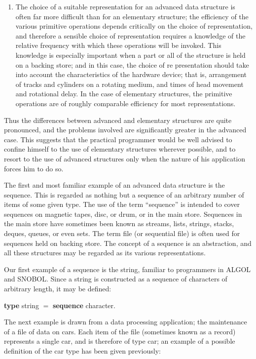\documentclass[twoside,11pt]{book}
\begin{document}
\begin{enumerate}[wide, nosep, label=(\arabic*)]
	\item The choice of a suitable representation for an advanced data structure is often far more difficult than for an elementary structure; the efficiency of the various primitive operations depends critically on the choice of representation, and therefore a sensible choice of representation requires a knowledge of the relative frequency with which these operations will be invoked. This knowledge is especially important when a part or all of the structure is held on a backing store; and in this case, the choice of re presentation should take into account the characteristics of the hardware device; that is, arrangement of tracks and cylinders on a rotating medium, and times of head movement and rotational delay. In the case of elementary structures, the primitive operations are of roughly comparable efficiency for most representations.
\end{enumerate}

Thus the differences between advanced and elementary structures are quite pronounced, and the problems involved are significantly greater in the advanced case. This suggests that the practical programmer would be well advised to confine himself to the use of elementary structures wherever possible, and to resort to the use of advanced structures only when the nature of his application forces him to do so.

The first and most familiar example of an advanced data structure is the sequence. This is regarded as nothing but a sequence of an arbitrary number of items of some given type. The use of the term ``sequence'' is intended to cover sequences on magnetic tapes, disc, or drum, or in the main store. Sequences in the main store have sometimes been known as streams, lists, strings, stacks, deques, queues, or even sets. The term file (or sequential file) is often used for sequences held on backing store. The concept of a sequence is an abstraction, and all these structures may be regarded as its various representations.

Our first example of a sequence is the string, familiar to programmers in ALGOL and SNOBOL. Since a string is constructed as a sequence of characters of arbitrary length, it may be defined:

\quad \textbf{type} string $=$ \textbf{sequence} character.

The next example is drawn from a data processing application; the maintenance of a file of data on cars. Each item of the file (sometimes known as a record) represents a single car, and is therefore of type car; an example of a possible definition of the car type has been given previously:
\end{document}

